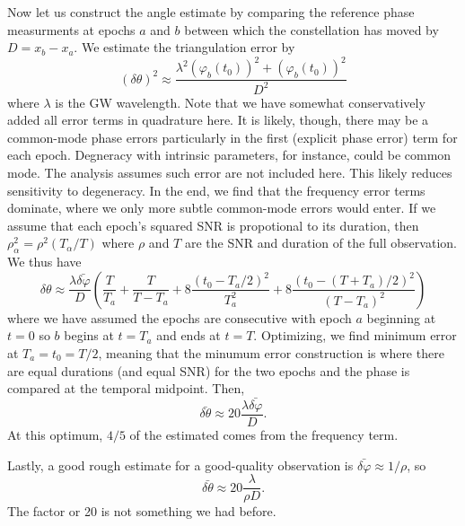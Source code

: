 \documentclass[aps,showpacs,12pt,onecolumn,prd,superscriptaddress,nofootinbib]{revtex4}
\begin{document}
Now let us construct the angle estimate by comparing the reference phase measurments at epochs $a$ and $b$ between which the constellation has moved by $D=x_b-x_a$. We estimate the triangulation error by
$$
\left(\delta\theta\right)^2 \approx \frac{\lambda^2\left(\varphi_b(t_0)\right)^2+\left(\varphi_b(t_0)\right)^2}{D^2}
$$
where $\lambda$ is the GW wavelength.
Note that we have somewhat conservatively added all error terms in quadrature here. It is likely, though, there may be a common-mode phase errors particularly in the first (explicit phase error) term for each epoch.  Degneracy with intrinsic parameters, for instance, could be common mode.  The analysis assumes such error are not included here.  This likely reduces sensitivity to degeneracy.  In the end, we find that the frequency error terms dominate, where we only more subtle common-mode errors would enter.
If we assume that each epoch's squared SNR is propotional to its duration, then $\rho^2_\alpha=\rho^2(T_\alpha/T)$ where $\rho$ and $T$ are the SNR and duration of the full observation. We thus have
$$
\delta\theta\approx\frac{\lambda\bar{\delta\varphi}}{D}\left(\frac{T}{T_a}+\frac{T}{T-T_a} + 8\frac{\left(t_0-T_a/2\right)^2}{T^2_a} +8\frac{\left(t_0-(T+T_a)/2\right)^2}{(T-T_a)^2}\right)
$$
where we have assumed the epochs are consecutive with epoch $a$ beginning at $t=0$ so $b$ begins at $t=T_a$ and ends at $t=T$. Optimizing, we find minimum error at $T_a=t_0=T/2$, meaning that the minumum error construction is where there are equal durations (and equal SNR) for the two epochs and the phase is compared at the temporal midpoint.  Then,
$$
\bar{\delta\theta}\approx20\frac{\lambda\bar{\delta\varphi}}{D}.
$$
At this optimum, $4/5$ of the estimated comes from the frequency term.

Lastly, a good rough estimate for a good-quality observation is $\bar{\delta\varphi}\approx 1/\rho$, so
$$
\bar{\delta\theta}\approx20\frac{\lambda}{\rho D}.
$$
The factor or 20 is not something we had before.
\end{document}
